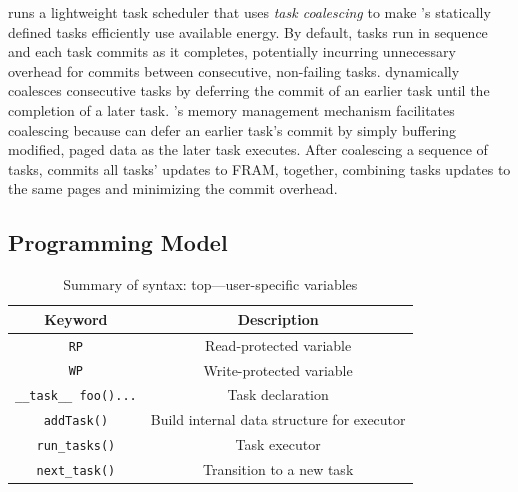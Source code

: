 \sys runs a lightweight task scheduler that uses {\em task coalescing} to make
\sys's statically defined tasks efficiently use available energy.  By default,
tasks run in sequence and each task commits as it completes, potentially
incurring unnecessary overhead for commits between consecutive, non-failing
tasks.  \sys dynamically coalesces consecutive tasks by deferring the commit of
an earlier task until the completion of a later task.  \sys's memory management
mechanism facilitates coalescing because \sys can defer an earlier task's
commit by simply buffering modified, paged data as the later task executes.
After coalescing a sequence of tasks, \sys commits all tasks' updates to FRAM,
together, combining tasks updates to the same pages and minimizing the commit
overhead.


\subsection{Programming Model}
\label{sec:overview_programming_model}

\begin{table}
	\centering
	\footnotesize
	\begin{tabular}{|c|c|}
		\hline
		Keyword & Description\\
		\hline\hline
		\texttt{RP} & Read-protected variable\\
		\texttt{WP} & Write-protected variable\\
		\texttt{\_\_task\_\_ foo(){...}} & Task declaration\\
		\texttt{addTask()} & Build internal data structure for executor \\
		\texttt{run\_tasks()} & Task executor \\ %
		\texttt{next\_task()} & Transition to a new task\\
		\hline
	\end{tabular}
\caption{Summary of \sys syntax: top---user-specific variables}
\label{tab:viper_syntax}
\end{table}
